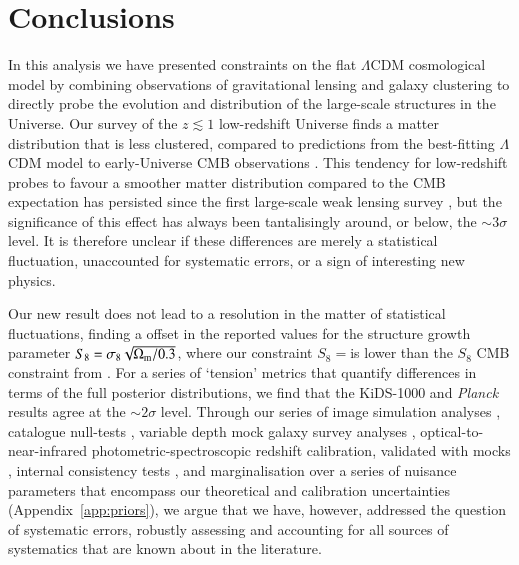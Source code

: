 \section{Conclusions}
\label{sec:conc}
In this analysis we have presented constraints on the flat $\Lambda$CDM cosmological model by combining observations of gravitational lensing and galaxy clustering to directly probe the evolution and distribution of the large-scale structures in the Universe.    Our survey of the $z \lesssim 1$ low-redshift Universe finds a matter distribution that is less clustered, compared to predictions from the best-fitting $\Lambda$CDM model to early-Universe CMB observations \citep{planck/etal:2018}.  This tendency for low-redshift probes to favour a smoother matter distribution compared to the CMB expectation has persisted since the first large-scale weak lensing survey \citep[CFHTLenS,][]{heymans/etal:2013}, but the significance of this effect has always been tantalisingly around, or below, the $\sim 3\sigma$ level.   It is therefore unclear if these differences are merely a statistical fluctuation, unaccounted for systematic errors, or a sign of interesting new physics.

Our new result does not lead to a resolution in the matter of statistical fluctuations, finding a \kpoff offset in the reported values for the structure growth parameter $S_8 = \sigma_8 \sqrt{\Omega_{\rm m}/0.3}$, where our constraint $S_8=$\kSeightval is \kpoffperc lower than the $S_8$ CMB constraint from \citet{planck/etal:2018}.   For a series of `tension' metrics that quantify differences in terms of the full posterior distributions, we find that the KiDS-1000 and {\it Planck} results agree at the $\sim 2 \sigma$ level.   Through our series of image simulation analyses \citep{kannawadi/etal:2019}, catalogue null-tests \citep{giblin/etal:inprep}, variable depth mock galaxy survey analyses \citep{joachimi/etal:inprep}, optical-to-near-infrared photometric-spectroscopic redshift calibration, validated with mocks \citep{wright/etal:2020, vandenbusch/etal:2020,hildebrandt/etal:inprep}, internal consistency tests \citep[][Fig.~\ref{fig:cosmology-params-all} and Appendix~\ref{app:sensitivity}]{asgari/etal:inprep}, and marginalisation over a series of nuisance parameters that encompass our theoretical and calibration uncertainties (Appendix~\ref{app:priors}),  we argue that we have, however, addressed the question of \tttp systematic errors, robustly assessing and accounting for all sources of systematics that are known about in the literature.    

